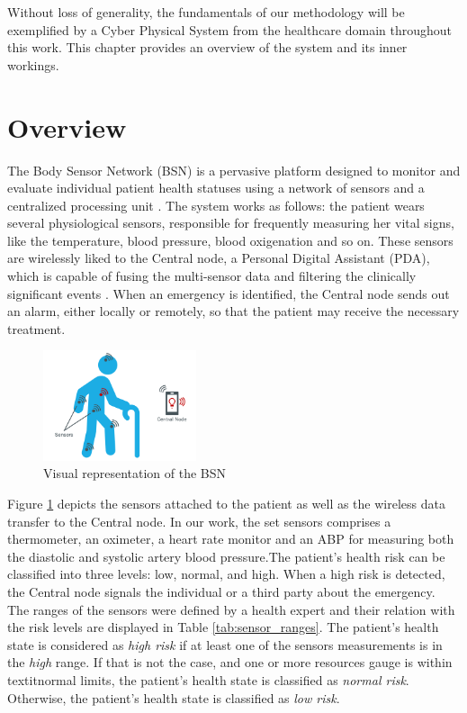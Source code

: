 \label{sec:BSN}
Without loss of generality, the fundamentals of our methodology will be exemplified by a Cyber Physical System from the healthcare domain throughout this work. This chapter provides an overview of the system and its inner workings.

\section{Overview}

The Body Sensor Network (BSN) \cite{pessoa2017building} is a pervasive platform designed to monitor and evaluate individual patient health statuses using a network of sensors and a centralized processing unit \cite{2021BSN}. The system works as follows: the patient wears several physiological sensors, responsible for frequently measuring her vital signs, like the temperature, blood pressure, blood oxigenation and so on. These sensors are wirelessly liked to the Central node, a Personal Digital Assistant (PDA), which is capable of fusing the multi-sensor data and filtering the clinically significant  events \cite{lo2005body}. When an emergency is identified, the Central node sends out an alarm, either locally or remotely, so that the patient may receive the necessary treatment. 

\begin{figure}[!h]
	\centering
	\includegraphics[width=0.4\textwidth, keepaspectratio]{img/BSN-overview.png}
	\caption{Visual representation of the BSN}
	\label{fig:BSN-overview}
\end{figure}

Figure \ref{fig:BSN-overview} depicts the sensors attached to the patient as well as the wireless data transfer to the Central node. In our work, the set sensors comprises a thermometer, an oximeter, a heart rate monitor and an ABP for measuring both the diastolic and systolic artery blood pressure.The patient's health risk can be classified into three levels: low, normal, and high. When a high risk is detected, the Central node signals the individual or a third party about the emergency. The ranges of the sensors were defined by a health expert \cite{pessoa2017building} and their relation with the risk levels are displayed in Table \ref{tab:sensor_ranges}. The patient's health state is considered as \textit{high risk} if at least one of the sensors measurements is in the \textit{high} range. If that is not the case, and one or more resources gauge is within textit{normal} limits, the patient's health state is classified as \textit{normal risk}. Otherwise, the patient's health state is classified as \textit{low risk}.

